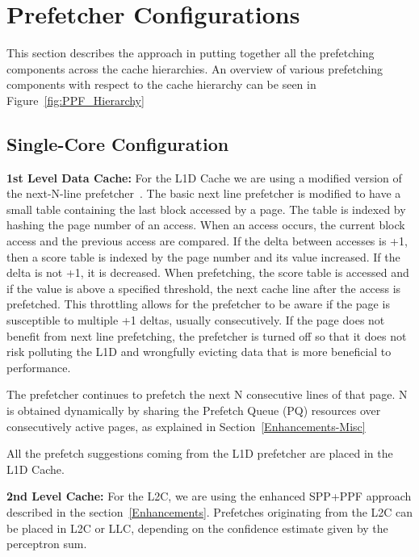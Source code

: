 \section{Prefetcher Configurations}
\label{Config}

This section describes the approach in putting together all the
prefetching components across the cache hierarchies. An overview
of various prefetching components with respect to the cache hierarchy
can be seen in Figure~\ref{fig:PPF_Hierarchy}

\subsection{Single-Core Configuration}
\label{Config-Single}

\noindent \textbf{1st Level Data Cache:} For the L1D Cache we are
using a modified version of the next-N-line prefetcher~\cite{nextn}.
The basic next line prefetcher is modified to have a small table
containing the last block accessed by a page. The table is indexed by
hashing the page number of an access.  When an access occurs, the
current block access and the previous access are compared.  If the
delta between accesses is +1, then a score table is indexed by the
page number and its value increased. If the delta is not +1, it is
decreased. When prefetching, the score table is accessed and if the
value is above a specified threshold, the next cache line after the
access is prefetched. This throttling allows for the prefetcher to be
aware if the page is susceptible to multiple +1 deltas, usually
consecutively. If the page does not benefit from next line
prefetching, the prefetcher is turned off so that it does not risk
polluting the L1D and wrongfully evicting data that is more beneficial
to performance.

The prefetcher continues to prefetch the next N consecutive lines of
that page. N is obtained dynamically by sharing the Prefetch Queue
(PQ) resources over consecutively active pages, as explained in
Section~\ref{Enhancements-Misc}

All the prefetch suggestions coming from the L1D prefetcher are placed
in the L1D Cache.

\noindent \textbf{2nd Level Cache:} For the L2C, we are using the
enhanced SPP+PPF approach described in the
section~\ref{Enhancements}. Prefetches originating from the L2C can be
placed in L2C or LLC, depending on the confidence estimate given by
the perceptron sum.


